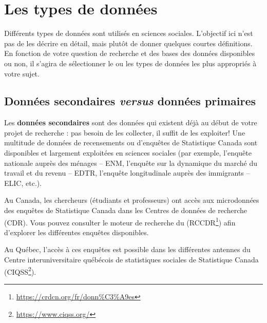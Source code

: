 \documentclass[
  11pt,
  french,
]{book}
\makeatletter
\renewcommand{\href}[2]{#2\footnote{\url{#1}}}
\newenvironment{kframev}{%
\medskip{}
\setlength{\fboxsep}{.8em}
 \def\at@end@of@kframev{}%
 \ifinner\ifhmode%
  \def\at@end@of@kframev{\end{minipage}}%
  \begin{minipage}{\columnwidth}%
 \fi\fi%
 \def\FrameCommand##1{\hskip\@totalleftmargin \hskip-\fboxsep
 \colorbox{shadebluecolor}{##1}\hskip-\fboxsep
     \hskip-\linewidth \hskip-\@totalleftmargin \hskip\columnwidth}%
 \MakeFramed {\advance\hsize-\width
   \@totalleftmargin\z@ \linewidth\hsize
   \@setminipage}}%
 {\par\unskip\endMakeFramed%
 \at@end@of@kframev}
\newenvironment{rmdblock}[1]
  {
  \begin{itemize}
  \renewcommand{\labelitemi}{
    \raisebox{-.7\height}[0pt][0pt]{
      {\setkeys{Gin}{width=3em,keepaspectratio}\texttt{[image: images/\#1]}}
    }
  }
  \setlength{\fboxsep}{1em}
  \begin{kframev}
  \small
  \item
  }
  {
  \end{kframev}
  \end{itemize}
  }
\newenvironment{bloc_notes}
  {\begin{rmdblock}{notes}}
  {\end{rmdblock}}
\makeatother
\begin{document}
\hypertarget{sect022}{%
\section{Les types de données}\label{sect022}}

Différents types de données sont utilisés en sciences sociales. L'objectif ici n'est pas de les décrire en détail, mais plutôt de donner quelques courtes définitions. En fonction de votre question de recherche et des bases des données disponibles ou non, il s'agira de sélectionner le ou les types de données les plus appropriés à votre sujet.

\hypertarget{sect0221}{%
\subsection{\texorpdfstring{Données secondaires \emph{versus} données primaires}{Données secondaires versus données primaires}}\label{sect0221}}

Les \textbf{données secondaires} sont des données qui existent déjà au début de votre projet de recherche : pas besoin de les collecter, il suffit de les exploiter! Une multitude de données de recensements ou d'enquêtes de Statistique Canada sont disponibles et largement exploitées en sciences sociales (par exemple, l'enquête nationale auprès des ménages -- ENM, l'enquête sur la dynamique du marché du travail et du revenu -- EDTR, l'enquête longitudinale auprès des immigrants -- ELIC, etc.).

\begin{bloc_notes}

Au Canada, les chercheurs (étudiants et professeurs) ont accès aux microdonnées des enquêtes de Statistique Canada dans les Centres de données de recherche (CDR). Vous pouvez consulter le moteur de recherche du (\href{https://crdcn.org/fr/donn\%C3\%A9es}{RCCDR}) afin d'explorer les différentes enquêtes disponibles.

Au Québec, l'accès à ces enquêtes est possible dans les différentes antennes du Centre interuniversitaire québécois de statistiques sociales de Statistique Canada (\href{https://www.ciqss.org/}{CIQSS}).

\end{bloc_notes}
\end{document}
